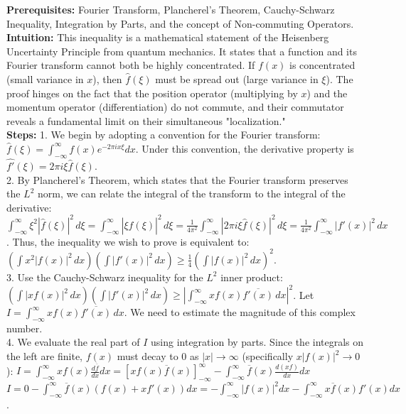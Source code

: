 \begin{solution}
\textbf{Prerequisites:} Fourier Transform, Plancherel's Theorem, Cauchy-Schwarz Inequality, Integration by Parts, and the concept of Non-commuting Operators. \\[1em]
\textbf{Intuition:} This inequality is a mathematical statement of the Heisenberg Uncertainty Principle from quantum mechanics. It states that a function and its Fourier transform cannot both be highly concentrated. If $f(x)$ is concentrated (small variance in $x$), then $\hat{f}(\xi)$ must be spread out (large variance in $\xi$). The proof hinges on the fact that the position operator (multiplying by $x$) and the momentum operator (differentiation) do not commute, and their commutator reveals a fundamental limit on their simultaneous "localization." \\[1em]
\textbf{Steps:}
1. We begin by adopting a convention for the Fourier transform: $\hat{f}(\xi) = \int_{-\infty}^{\infty} f(x) e^{-2\pi i x \xi} dx$. Under this convention, the derivative property is $\widehat{f'}(\xi) = 2\pi i \xi \hat{f}(\xi)$. \\[1em]
2. By Plancherel's Theorem, which states that the Fourier transform preserves the $L^2$ norm, we can relate the integral of the transform to the integral of the derivative:
$\int_{-\infty}^{\infty} \xi^2 |\hat{f}(\xi)|^2 \, d\xi = \int_{-\infty}^{\infty} |\xi \hat{f}(\xi)|^2 \, d\xi = \frac{1}{4\pi^2} \int_{-\infty}^{\infty} |2\pi i \xi \hat{f}(\xi)|^2 \, d\xi = \frac{1}{4\pi^2} \int_{-\infty}^{\infty} |f'(x)|^2 \, dx$.
Thus, the inequality we wish to prove is equivalent to:
$\left( \int x^2 |f(x)|^2 \, dx \right) \left( \int |f'(x)|^2 \, dx \right) \geq \frac{1}{4} \left( \int |f(x)|^2 \, dx \right)^2$. \\[1em]
3. Use the Cauchy-Schwarz inequality for the $L^2$ inner product:
$\left( \int |x f(x)|^2 \, dx \right) \left( \int |f'(x)|^2 \, dx \right) \geq \left| \int_{-\infty}^{\infty} x f(x) \overline{f'(x)} \, dx \right|^2$.
Let $I = \int_{-\infty}^{\infty} x f(x) \overline{f'(x)} \, dx$. We need to estimate the magnitude of this complex number. \\[1em]
4. We evaluate the real part of $I$ using integration by parts. Since the integrals on the left are finite, $f(x)$ must decay to $0$ as $|x| \to \infty$ (specifically $x|f(x)|^2 \to 0$):
$I = \int_{-\infty}^{\infty} x f(x) \frac{d\overline{f}}{dx} dx = [x f(x) \overline{f}(x)]_{-\infty}^{\infty} - \int_{-\infty}^{\infty} \overline{f}(x) \frac{d(xf)}{dx} dx$
$I = 0 - \int_{-\infty}^{\infty} \overline{f}(x) (f(x) + x f'(x)) dx = -\int_{-\infty}^{\infty} |f(x)|^2 dx - \int_{-\infty}^{\infty} x \overline{f}(x) f'(x) dx$.

\end{solution}
